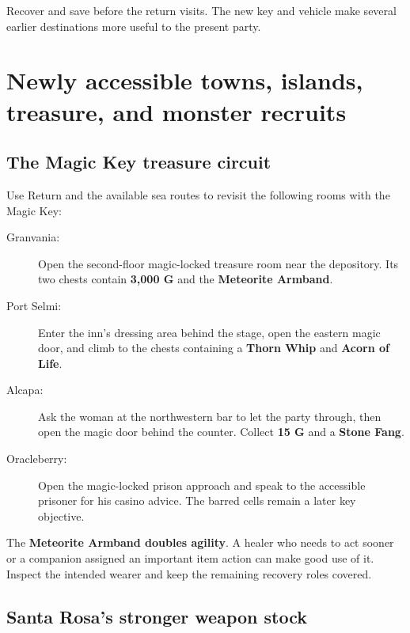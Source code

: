 Recover and save before the return visits. The new key and vehicle
make several earlier destinations more useful to the present party.

\section{Newly accessible towns, islands, treasure, and monster recruits}

\subsection*{The Magic Key treasure circuit}

Use Return and the available sea routes to revisit the following
rooms with the Magic Key:
\begin{description}
  \item[Granvania:] Open the second-floor magic-locked treasure room
    near the depository. Its two chests contain \textbf{3,000 G}
    and the \textbf{Meteorite Armband}.
  \item[Port Selmi:] Enter the inn's dressing area behind the stage,
    open the eastern magic door, and climb to the chests containing
    a \textbf{Thorn Whip} and \textbf{Acorn of Life}.
  \item[Alcapa:] Ask the woman at the northwestern bar to let the
    party through, then open the magic door behind the counter.
    Collect \textbf{15 G} and a \textbf{Stone Fang}.
  \item[Oracleberry:] Open the magic-locked prison approach and
    speak to the accessible prisoner for his casino advice.
    The barred cells remain a later key objective.
\end{description}

The \textbf{Meteorite Armband doubles agility}. A healer who needs
to act sooner or a companion assigned an important item action can
make good use of it. Inspect the intended wearer and keep the
remaining recovery roles covered.

\subsection*{Santa Rosa's stronger weapon stock}

